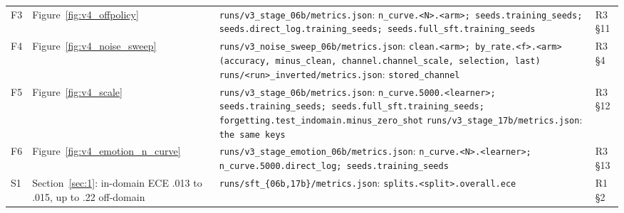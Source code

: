 \documentclass[10pt,letterpaper]{article}
\theoremstyle{plain}
\begin{document}
{\begin{longtable}{@{}p{}>{\raggedright\arraybackslash}p{}>{\raggedright\arraybackslash}p{}>{\raggedright\arraybackslash}p{}@{}}
F3 & Figure~\ref{fig:v4_offpolicy} & \texttt{runs/\allowbreak{}v3\_\allowbreak{}stage\_\allowbreak{}06b/\allowbreak{}metrics.\allowbreak{}json}: \texttt{n\_\allowbreak{}curve.\allowbreak{}\textless{}N\textgreater{}.\allowbreak{}\textless{}arm\textgreater{};\allowbreak{} seeds.\allowbreak{}training\_\allowbreak{}seeds;\allowbreak{} seeds.\allowbreak{}direct\_\allowbreak{}log.\allowbreak{}training\_\allowbreak{}seeds;\allowbreak{} seeds.\allowbreak{}full\_\allowbreak{}sft.\allowbreak{}training\_\allowbreak{}seeds} & R3 \S11 \\
F4 & Figure~\ref{fig:v4_noise_sweep} & \texttt{runs/\allowbreak{}v3\_\allowbreak{}noise\_\allowbreak{}sweep\_\allowbreak{}06b/\allowbreak{}metrics.\allowbreak{}json}: \texttt{clean.\allowbreak{}\textless{}arm\textgreater{};\allowbreak{} by\_\allowbreak{}rate.\allowbreak{}\textless{}f\textgreater{}.\allowbreak{}\textless{}arm\textgreater{} (accuracy, minus\_\allowbreak{}clean, channel.\allowbreak{}channel\_\allowbreak{}scale, selection, last)} \newline \texttt{runs/\allowbreak{}\textless{}run\textgreater{}\_\allowbreak{}inverted/\allowbreak{}metrics.\allowbreak{}json}: \texttt{stored\_\allowbreak{}channel} & R3 \S4 \\
F5 & Figure~\ref{fig:v4_scale} & \texttt{runs/\allowbreak{}v3\_\allowbreak{}stage\_\allowbreak{}06b/\allowbreak{}metrics.\allowbreak{}json}: \texttt{n\_\allowbreak{}curve.\allowbreak{}5000.\allowbreak{}\textless{}learner\textgreater{};\allowbreak{} seeds.\allowbreak{}training\_\allowbreak{}seeds;\allowbreak{} seeds.\allowbreak{}full\_\allowbreak{}sft.\allowbreak{}training\_\allowbreak{}seeds;\allowbreak{} forgetting.\allowbreak{}test\_\allowbreak{}indomain.\allowbreak{}minus\_\allowbreak{}zero\_\allowbreak{}shot} \newline \texttt{runs/\allowbreak{}v3\_\allowbreak{}stage\_\allowbreak{}17b/\allowbreak{}metrics.\allowbreak{}json}: \texttt{the same keys} & R3 \S12 \\
F6 & Figure~\ref{fig:v4_emotion_n_curve} & \texttt{runs/\allowbreak{}v3\_\allowbreak{}stage\_\allowbreak{}emotion\_\allowbreak{}06b/\allowbreak{}metrics.\allowbreak{}json}: \texttt{n\_\allowbreak{}curve.\allowbreak{}\textless{}N\textgreater{}.\allowbreak{}\textless{}learner\textgreater{};\allowbreak{} n\_\allowbreak{}curve.\allowbreak{}5000.\allowbreak{}direct\_\allowbreak{}log;\allowbreak{} seeds.\allowbreak{}training\_\allowbreak{}seeds} & R3 \S13 \\
S1 & Section~\ref{sec:1}: in-domain ECE .013 to .015, up to .22 off-domain & \texttt{runs/\allowbreak{}sft\_\allowbreak{}\{06b,17b\}/\allowbreak{}metrics.\allowbreak{}json}: \texttt{splits.\allowbreak{}\textless{}split\textgreater{}.\allowbreak{}overall.\allowbreak{}ece} & R1 \S2 \\

\end{longtable}}
\end{document}
